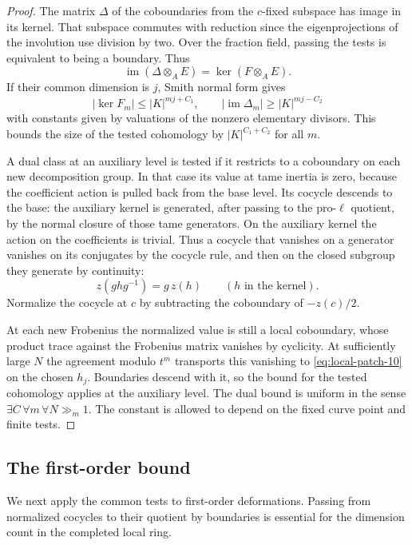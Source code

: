 \begin{proof}
The matrix
\(\Delta\) of the coboundaries from the \(c\)-fixed subspace
has image in its kernel. That subspace commutes with
reduction since the eigenprojections of the involution
use division by two. Over the fraction field, passing the tests is equivalent to being a boundary. Thus 
\[
 \operatorname{im}(\Delta\otimes_A E)=\ker(F\otimes_A E).
\]
 If their common dimension is \(j\), Smith
normal form gives
\[
        |\ker F_m|\le |K|^{mj+C_1},\qquad
        |\operatorname{im}\Delta_m|\ge |K|^{mj-C_2}
\]
with constants given by valuations of the nonzero
elementary divisors. This bounds the size of the tested
cohomology by \(|K|^{C_1+C_2}\) for all \(m\).

A dual class at an auxiliary level is tested if it
restricts to a coboundary on each new decomposition
group. In that case its value at tame inertia is zero,
because the coefficient action is pulled back from the
base level. Its cocycle descends to the base: the
auxiliary kernel is generated, after passing to the
pro-\(\ell\) quotient, by the normal closure of those tame
generators. On the auxiliary kernel the action on the coefficients is trivial. Thus a cocycle that vanishes on a generator vanishes on its conjugates by the cocycle rule, and then on the closed subgroup they generate by continuity:
\[
 z(ghg^{-1})=g\,z(h)\qquad(h\text{ in the kernel}).
\] Normalize
the cocycle at \(c\) by subtracting the coboundary of
\(-z(c)/2\).

At each new Frobenius the normalized value
is still a local coboundary, whose product trace against
the Frobenius matrix vanishes by cyclicity. At sufficiently
large \(N\) the agreement modulo \(t^m\) transports this
vanishing to \eqref{eq:local-patch-10} on the chosen \(h_j\). Boundaries descend
with it, so the bound for the tested cohomology applies
at the auxiliary level. The dual bound is uniform in the sense \(\exists C\,\forall m\,\forall N\gg_m 1\). The constant is
allowed to depend on the fixed curve point and finite tests.

\end{proof}

\subsection{The first-order bound}

We next apply the common tests to first-order deformations. Passing from normalized
cocycles to their quotient by boundaries is essential for the dimension count in the
completed local ring.

